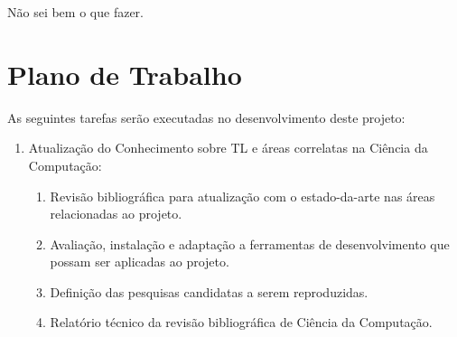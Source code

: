 \documentclass[
12pt, %
a4paper, %
onecolumn, %
]{article}
\begin{document}
Não sei bem o que fazer. 


\section{Plano de Trabalho}

As seguintes tarefas serão executadas no desenvolvimento deste projeto:
\begin{enumerate}
  \item Atualização do Conhecimento sobre TL e áreas correlatas na Ciência da Computação:
  \begin{enumerate}
    \item Revisão bibliográfica para atualização com o estado-da-arte nas áreas relacionadas ao projeto.
    \item Avaliação, instalação e adaptação a ferramentas de desenvolvimento que possam ser aplicadas ao projeto.
    \item Definição das pesquisas candidatas a serem reproduzidas.
    \item Relatório técnico da revisão bibliográfica de Ciência da Computação.
  \end{enumerate}


\end{enumerate}
\end{document}
